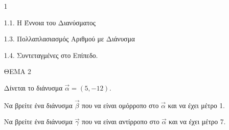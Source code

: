 \begin{ylh}{1}
    \item 1.1. Η Έννοια του Διανύσματος
    \item 1.3. Πολλαπλασιασμός Αριθμού με Διάνυσμα
    \item 1.4. Συντεταγμένες στο Επίπεδο.
\end{ylh}
ΘΕΜΑ 2

Δίνεται το διάνυσμα $\vec{\alpha} = (5, -12)$.

\begin{alist}
\item Να βρείτε ένα διάνυσμα $\vec{\beta}$ που να είναι ομόρροπο στο $\vec{\alpha}$ και να έχει μέτρο 1. 
\item Να βρείτε ένα διάνυσμα $\vec{\gamma}$ που να είναι αντίρροπο στο $\vec{\alpha}$ και να έχει μέτρο 7. 
\end{alist}